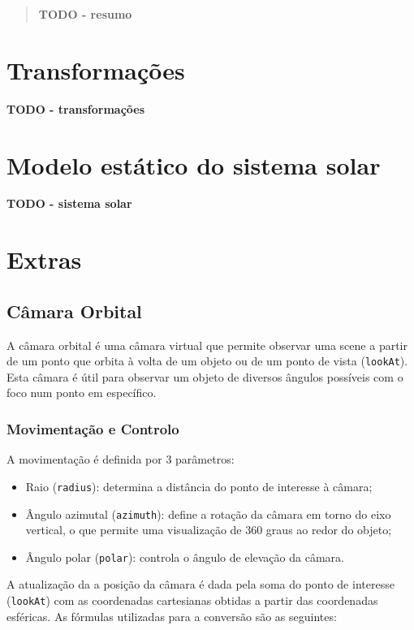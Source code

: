 \documentclass[12pt, a4paper]{article}
\begin{document}
\pagebreak

\begin{abstract}
    \textbf{\color{red} TODO - resumo}
\end{abstract}

\section{Transformações}

\textbf{\color{red} TODO - transformações}

\section{Modelo estático do sistema solar}

\textbf{\color{red} TODO - sistema solar}

\section{Extras}

\subsection{Câmara Orbital}

A câmara orbital é uma câmara virtual que permite observar uma scene a partir de um ponto que
orbita à volta de um objeto ou de um ponto de vista (\texttt{lookAt}). Esta câmara é útil para
observar um objeto de diversos ângulos possíveis com o foco num ponto em específico.

\subsubsection{Movimentação e Controlo}

A movimentação é definida por 3 parâmetros:
\begin{itemize}
    \item Raio (\texttt{radius}): determina a distância do ponto de interesse à câmara;
    \item Ângulo azimutal (\texttt{azimuth}): define a rotação da câmara em torno do eixo vertical,
    o que permite uma visualização de 360 graus ao redor do objeto;
    \item Ângulo polar (\texttt{polar}): controla o ângulo de elevação da câmara.
\end{itemize}

A atualização da a posição da câmara é dada pela soma do ponto de interesse (\texttt{lookAt}) com
as coordenadas cartesianas obtidas a partir das coordenadas esféricas. As fórmulas utilizadas para
a conversão são as seguintes:
\end{document}
